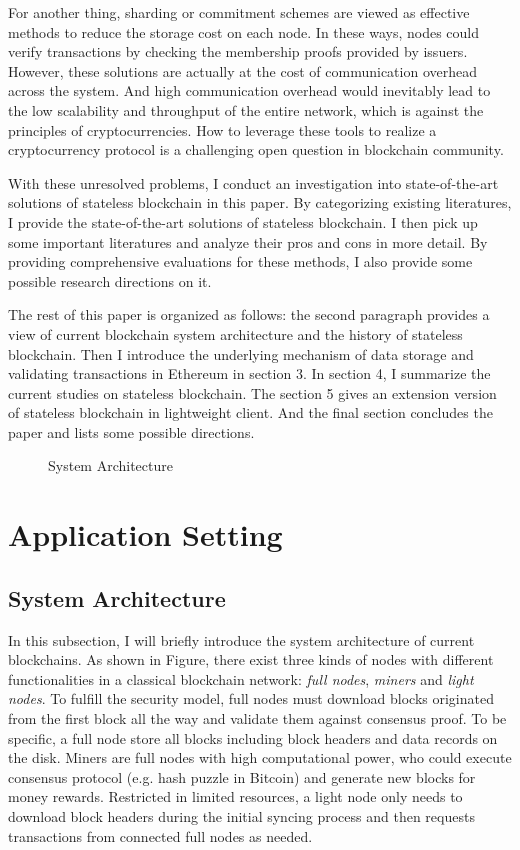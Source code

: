 \documentclass[conference]{IEEEtran}
\begin{document}
For another thing, sharding or commitment schemes are viewed as effective methods to reduce the storage cost on each node.
%
In these ways, nodes could verify transactions by checking the membership proofs provided by issuers.
%
However, these solutions are actually at the cost of communication overhead across the system.
%
And high communication overhead would inevitably lead to the low scalability and throughput of the entire network, which is against the principles of cryptocurrencies.
%
How to leverage these tools to realize a cryptocurrency protocol is a challenging open question in blockchain community.

With these unresolved problems, I conduct an investigation into state-of-the-art solutions of stateless blockchain in this paper.
%
By categorizing existing literatures, I provide the state-of-the-art solutions of stateless blockchain.
%
I then pick up some important literatures and analyze their pros and cons in more detail.
%
By providing comprehensive evaluations for these methods, I also provide some possible research directions on it.

The rest of this paper is organized as follows: the second paragraph provides a view of current blockchain system architecture and the history of stateless blockchain.
%
Then I introduce the underlying mechanism of data storage and validating transactions in Ethereum in section 3.
%
In section 4, I summarize the current studies on stateless blockchain.
%
The section 5 gives an extension version of stateless blockchain in lightweight client.
%
And the final section concludes the paper and lists some possible directions.

\begin{figure}[t]
  \centering
  \resizebox{0.7\linewidth}{!}{}
  \caption{System Architecture}\label{fig:model}
\end{figure}

\section{Application Setting}
\subsection{System Architecture}
In this subsection, I will briefly introduce the system architecture of current blockchains.
%
As shown in Figure, there exist three kinds of nodes with different functionalities in a classical blockchain network:
\textit{full nodes}, \textit{miners} and \textit{light nodes}.
%
To fulfill the security model, full nodes must download blocks originated from the first block all the way and validate them against consensus proof.
%
To be specific, a full node store all blocks including block headers and data records on the disk.
%
Miners are full nodes with high computational power, who could execute consensus protocol (e.g. hash puzzle in Bitcoin) and generate new blocks for money rewards.
%
Restricted in limited resources, a light node only needs to download block headers during the initial syncing process and then requests transactions from connected full nodes as needed.
\end{document}
